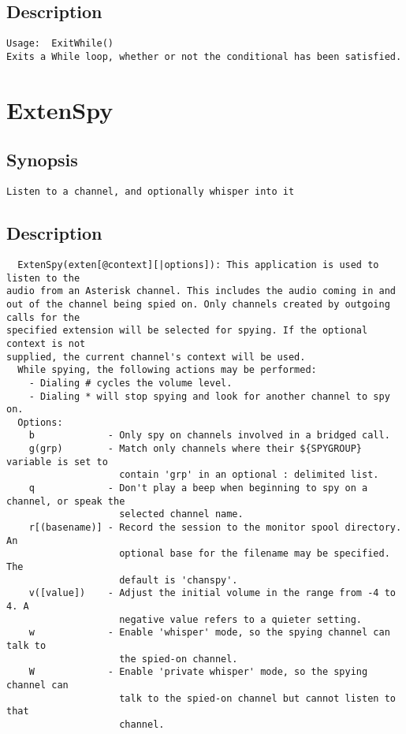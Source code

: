 \subsection{Description}
\begin{verbatim}
Usage:  ExitWhile()
Exits a While loop, whether or not the conditional has been satisfied.

\end{verbatim}


\section{ExtenSpy}
\subsection{Synopsis}
\begin{verbatim}
Listen to a channel, and optionally whisper into it
\end{verbatim}
\subsection{Description}
\begin{verbatim}
  ExtenSpy(exten[@context][|options]): This application is used to listen to the
audio from an Asterisk channel. This includes the audio coming in and
out of the channel being spied on. Only channels created by outgoing calls for the
specified extension will be selected for spying. If the optional context is not
supplied, the current channel's context will be used.
  While spying, the following actions may be performed:
    - Dialing # cycles the volume level.
    - Dialing * will stop spying and look for another channel to spy on.
  Options:
    b             - Only spy on channels involved in a bridged call.
    g(grp)        - Match only channels where their ${SPYGROUP} variable is set to
                    contain 'grp' in an optional : delimited list.
    q             - Don't play a beep when beginning to spy on a channel, or speak the
                    selected channel name.
    r[(basename)] - Record the session to the monitor spool directory. An
                    optional base for the filename may be specified. The
                    default is 'chanspy'.
    v([value])    - Adjust the initial volume in the range from -4 to 4. A
                    negative value refers to a quieter setting.
    w             - Enable 'whisper' mode, so the spying channel can talk to
                    the spied-on channel.
    W             - Enable 'private whisper' mode, so the spying channel can
                    talk to the spied-on channel but cannot listen to that
                    channel.

\end{verbatim}


